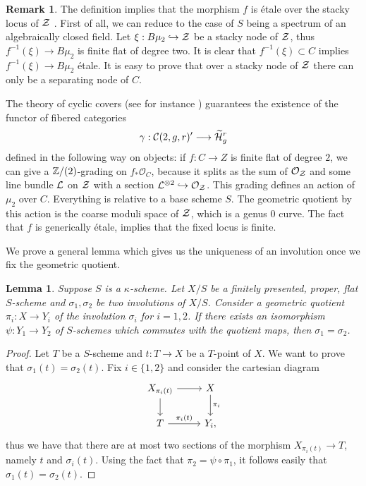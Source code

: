 \documentclass{alggeom}
\numberwithin{equation}{section}
\numberwithin{subsection}{section}
\newtheorem{lemma}[theorem]{Lemma}
\theoremstyle{definition}
\newtheorem{remark}[theorem]{Remark}
\theoremstyle{remark}
\newcommand\cC{\mathcal{C}} \newcommand\cD{\mathcal{D}}
\newcommand\cO{\mathcal{O}} \newcommand\cP{\mathcal{P}}
\newcommand{\Htilde}{\widetilde{\cH}}
\begin{document}
\begin{remark}
	The definition implies that the morphism $f$ is \'etale over the stacky locus of $\mathcal{Z}$ . First of all, we can reduce to the case of $S$ being a spectrum of an algebraically closed field. Let $\xi: B\mu_2\hookrightarrow \mathcal{Z}$ be a stacky node of $\mathcal{Z}$, thus $f^{-1}(\xi)\rightarrow B\mu_2$ is finite flat of degree two. It is clear that  $f^{-1}(\xi)\subset C$ implies $f^{-1}(\xi)\rightarrow B\mu_2$ \'etale. It is easy to prove that over a stacky node of $\mathcal{Z}$ there can only be a separating node of $C$. 
\end{remark}

The theory of cyclic covers (see for instance \cite{ArVis}) guarantees the existence of the functor of fibered categories 
$$\gamma:\cC(2,g,r)' \longrightarrow \Htilde_g^r$$
defined in the following way on objects: if $f:C\rightarrow Z$ is finite flat of degree $2$, we can give a $\mathbb{Z}/(2)$-grading on $f_*\cO_C$, because it splits as the sum of $\cO_{\cZ}$ and some line bundle $\mathcal{L}$ on $\mathcal{Z}$ with a section $\cL^{\otimes 2}\hookrightarrow \cO_{\cZ}$. This grading defines an action of $\mu_2$ over $C$. Everything is relative to a base scheme $S$. The geometric quotient by this action is the coarse moduli space of $\mathcal{Z}$, which is a genus $0$ curve. The fact that $f$ is generically \'etale, implies that the fixed locus is finite. 

We prove a general lemma which gives us the uniqueness of an involution once we fix the geometric quotient. 

\begin{lemma}\label{lem:unique-inv-quotient}
	Suppose $S$ is a $\kappa$-scheme.  Let $X/S$ be a finitely presented, proper, flat $S$-scheme and $\sigma_1,\sigma_2$ be two involutions of $X/S$. Consider a geometric quotient $\pi_i:X\rightarrow Y_i$ of the involution $\sigma_i$ for $i=1,2$. If there exists an isomorphism  $\psi:Y_1 \rightarrow Y_2$ of $S$-schemes which commutes with the quotient maps, then $\sigma_1=\sigma_2$. 
\end{lemma}
\begin{proof}
	Let $T$ be a $S$-scheme and $t:T\rightarrow X$ be a $T$-point of $X$. We want to prove that $\sigma_1(t)=\sigma_2(t)$.
	Fix $i\in \{1,2\}$ and consider the cartesian diagram
	$$
	\begin{tikzcd}
	X_{\pi_i(t)} \arrow[d] \arrow[r] & X \arrow[d, "\pi_i"] \\
	T \arrow[r, "\pi_i(t)"]          & Y_i,                
	\end{tikzcd}
	$$
	thus we have that there are at most two sections of the morphism $X_{\pi_i(t)}\rightarrow T$, namely $t$ and $\sigma_i(t)$. Using the fact that $\pi_2=\psi\circ \pi_1$, it follows easily that $\sigma_1(t)=\sigma_2(t)$.
\end{proof}	
\end{document}

